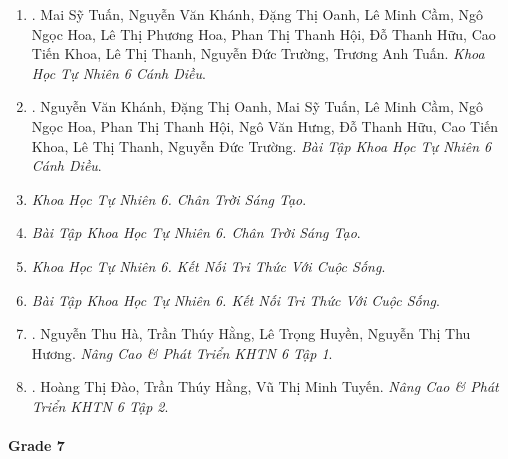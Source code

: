 \documentclass{article}
\begin{document}
\begin{enumerate}
	\item \cite{SGK_KHTN_6_CD}. {\sc Mai Sỹ Tuấn, Nguyễn Văn Khánh, Đặng Thị Oanh, Lê Minh Cầm, Ngô Ngọc Hoa, Lê Thị Phương Hoa, Phan Thị Thanh Hội, Đỗ Thanh Hữu, Cao Tiến Khoa, Lê Thị Thanh, Nguyễn Đức Trường, Trương Anh Tuấn}. {\it Khoa Học Tự Nhiên 6 Cánh Diều}.\hfill{\sf[done]}

	\item \cite{SBT_KHTN_6_CD}. {\sc Nguyễn Văn Khánh, Đặng Thị Oanh, Mai Sỹ Tuấn, Lê Minh Cầm, Ngô Ngọc Hoa, Phan Thị Thanh Hội, Ngô Văn Hưng, Đỗ Thanh Hữu, Cao Tiến Khoa, Lê Thị Thanh, Nguyễn Đức Trường}. {\it Bài Tập Khoa Học Tự Nhiên 6 Cánh Diều}.\hfill{\sf[done]}

	\item {\it Khoa Học Tự Nhiên 6. Chân Trời Sáng Tạo}.

	\item {\it Bài Tập Khoa Học Tự Nhiên 6. Chân Trời Sáng Tạo}.

	\item {\it Khoa Học Tự Nhiên 6. Kết Nối Tri Thức Với Cuộc Sống}.

	\item {\it Bài Tập Khoa Học Tự Nhiên 6. Kết Nối Tri Thức Với Cuộc Sống}.

	\item \cite{ncpt_KHTN_6_tap_1}. {\sc Nguyễn Thu Hà, Trần Thúy Hằng, Lê Trọng Huyền, Nguyễn Thị Thu Hương}. {\it Nâng Cao \& Phát Triển KHTN 6 Tập 1}.\hfill{\sf[done]}

	\item \cite{ncpt_KHTN_6_tap_2}. {\sc Hoàng Thị Đào, Trần Thúy Hằng, Vũ Thị Minh Tuyến}. {\it Nâng Cao \& Phát Triển KHTN 6 Tập 2}.\hfill{\sf[done]}
\end{enumerate}

\paragraph{Grade 7}
\end{document}
